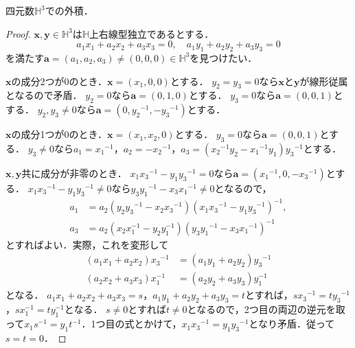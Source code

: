 \documentclass[a4paper, leqno]{ltjsreport}
\begin{document}
\begin{screen}
  四元数$\mathbb{H}^3$での外積．
\end{screen}
\begin{proof}
  $\boldsymbol{x}, \boldsymbol{y} \in \mathbb{H}^3$は$\mathbb{H}$上右線型独立であるとする．
  \[a_1x_1 + a_2x_2 + a_3x_3 = 0,\quad a_1y_1 + a_2y_2 + a_3y_3 = 0\]
  を満たす$\boldsymbol{a} = (a_1, a_2, a_3) \neq (0, 0, 0) \in \mathbb{H}^3$を見つけたい．

  $\boldsymbol{x}$の成分2つが$0$のとき．$\boldsymbol{x}=(x_1, 0, 0)$とする．
  $y_2=y_3=0$なら$\boldsymbol{x}$と$\boldsymbol{y}$が線形従属となるので矛盾．
  $y_2=0$なら$\boldsymbol{a} = (0, 1, 0)$とする．
  $y_3=0$なら$\boldsymbol{a} = (0, 0, 1)$とする．
  $y_2, y_3 \neq 0$なら$\boldsymbol{a} = (0, y_2{}^{-1}, -y_3{}^{-1})$とする．

  $\boldsymbol{x}$の成分1つが$0$のとき．$\boldsymbol{x} = (x_1, x_2, 0)$とする．
  $y_3 = 0$なら$\boldsymbol{a} = (0, 0, 1)$とする．
  $y_3 \neq 0$なら$a_1 = x_1{}^{-1}$，$a_2 = -x_2{}^{-1}$，$a_3 = (x_2{}^{-1} y_2 - x_1{}^{-1} y_1) y_3{}^{-1}$とする．

  $\boldsymbol{x}, \boldsymbol{y}$共に成分が非零のとき．
  $x_1 x_3{}^{-1} - y_1 y_3{}^{-1} = 0$なら$\boldsymbol{a} = (x_1{}^{-1}, 0, -x_3{}^{-1})$とする．
  $x_1 x_3{}^{-1} - y_1 y_3{}^{-1} \neq 0$なら$y_3 y_1{}^{-1} - x_3 x_1{}^{-1} \neq 0$となるので，
  \begin{align*}
    a_1 &= a_2 (y_2 {y_3}^{-1} - x_2 {x_3}^{-1}) (x_1 x_3{}^{-1} - y_1 y_3{}^{-1})^{-1},\\
    a_3 &= a_2 (x_2 {x}_1^{-1} - y_2 {y}_1^{-1}) (y_3 y_1{}^{-1} - x_3 x_1{}^{-1})^{-1}
  \end{align*}
  とすればよい．実際，これを変形して
  \begin{align*}
    (a_1x_1 + a_2x_2){x_3}^{-1} &= (a_1y_1 + a_2y_2){y_3}^{-1} \\
    (a_2x_2 + a_3x_3){x}_1^{-1} &= (a_2y_2 + a_3y_3){y}_1^{-1}
  \end{align*}
  となる．
  $a_1x_1 + a_2x_2 + a_3x_3 = s$，$a_1y_1 + a_2y_2 + a_3y_3 = t$とすれば，$s{x_3}^{-1} = t{y_3}^{-1}$，$s{x}_1^{-1} = t{y}_1^{-1}$となる．
  $s \neq 0$とすれば$t \neq 0$となるので，2つ目の両辺の逆元を取って$x_1s^{-1} = y_1t^{-1}$．1つ目の式とかけて，$x_1{x_3}^{-1} = y_1{y_3}^{-1}$となり矛盾．従って$s=t=0$．
\end{proof}
\end{document}
